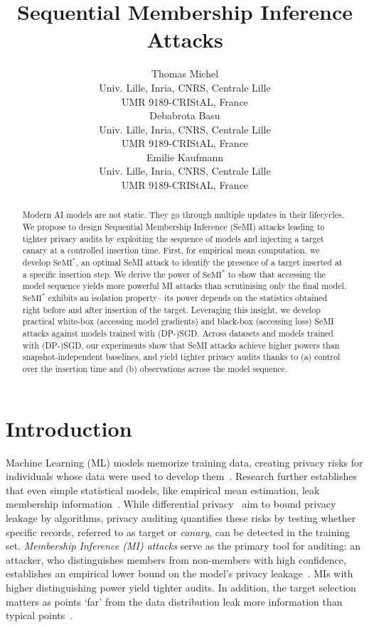\documentclass{article}
\title{Sequential Membership Inference Attacks}
\author{%
  Thomas Michel\\
  Univ. Lille, Inria, CNRS, Centrale Lille\\
  UMR 9189-CRIStAL, France \\
  \And
  Debabrota Basu \\
  Univ. Lille, Inria, CNRS, Centrale Lille\\
  UMR 9189-CRIStAL, France \\
  \And
  Emilie Kaufmann\\
  Univ. Lille, Inria, CNRS, Centrale Lille\\
  UMR 9189-CRIStAL, France \\
}
\theoremstyle{plain}
\theoremstyle{definition}
\theoremstyle{remark}
\begin{document}
\maketitle

\begin{abstract}
  Modern AI models are not static. They go through multiple updates in their lifecycles.
  We propose to design Sequential Membership Inference (SeMI) attacks leading to tighter privacy audits by exploiting the sequence of models and injecting a target canary at a controlled insertion time.
  First, for empirical mean computation, we develop $\mathrm{SeMI}^{\ast}$, an {optimal SeMI attack to identify the presence of a target inserted at a specific insertion step}.
  We derive the power of $\mathrm{SeMI}^{\ast}$ to show that accessing the model sequence yields more powerful MI attacks than scrutinising only the final model.
  $\mathrm{SeMI}^{\ast}$ exhibits an isolation property-- its power depends on the statistics obtained right before and after insertion of the target.
  Leveraging this insight, we develop practical white-box (accessing model gradients) and black-box (accessing loss) SeMI attacks against models trained with (DP-)SGD.
  Across datasets and models trained with (DP-)SGD, our experiments show that SeMI attacks achieve higher powers than snapshot-independent baselines, and yield tighter privacy audits thanks to (a) control over the insertion time and (b) observations across the model sequence.
\end{abstract}


\section{Introduction}\label{sec:introduction}

Machine Learning (ML) models memorize training data, creating privacy risks for individuals whose data were used to develop them~\citep{shokri2017membership, carlini2022membership}. Research further establishes that even simple statistical models, like empirical mean estimation, leak membership information~\citep{homer2008resolving,azizeTargetsAreHarder2025}. %
While differential privacy~\citep{dwork2006calibrating, dpbook} aim to bound privacy leakage by algorithms, privacy auditing quantifies these risks by testing whether specific records, referred to as target or \textit{canary}, can be detected in the training set.
\textit{Membership Inference (MI) attacks} serve as the primary tool for auditing: an attacker, who distinguishes members from non-members with high confidence, establishes an empirical lower bound on the model's privacy leakage~\citep{jayaraman2019evaluating, jagielski2020auditing,nasrTightAuditingDifferentially2023}. MIs with higher distinguishing power yield tighter audits.
In addition, the target selection matters as points `far' from the data distribution leak more information than typical points~\citep{azizeTargetsAreHarder2025, carlini2022privacyonion}.
\end{document}
